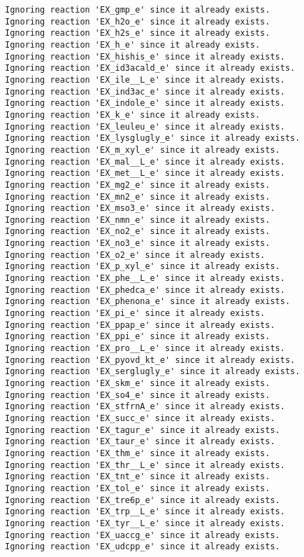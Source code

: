 \documentclass[
  letterpaper,
  DIV=11,
  numbers=noendperiod]{scrartcl}
\begin{document}
\begin{verbatim}
Ignoring reaction 'EX_gmp_e' since it already exists.
Ignoring reaction 'EX_h2o_e' since it already exists.
Ignoring reaction 'EX_h2s_e' since it already exists.
Ignoring reaction 'EX_h_e' since it already exists.
Ignoring reaction 'EX_hishis_e' since it already exists.
Ignoring reaction 'EX_id3acald_e' since it already exists.
Ignoring reaction 'EX_ile__L_e' since it already exists.
Ignoring reaction 'EX_ind3ac_e' since it already exists.
Ignoring reaction 'EX_indole_e' since it already exists.
Ignoring reaction 'EX_k_e' since it already exists.
Ignoring reaction 'EX_leuleu_e' since it already exists.
Ignoring reaction 'EX_lysglugly_e' since it already exists.
Ignoring reaction 'EX_m_xyl_e' since it already exists.
Ignoring reaction 'EX_mal__L_e' since it already exists.
Ignoring reaction 'EX_met__L_e' since it already exists.
Ignoring reaction 'EX_mg2_e' since it already exists.
Ignoring reaction 'EX_mn2_e' since it already exists.
Ignoring reaction 'EX_mso3_e' since it already exists.
Ignoring reaction 'EX_nmn_e' since it already exists.
Ignoring reaction 'EX_no2_e' since it already exists.
Ignoring reaction 'EX_no3_e' since it already exists.
Ignoring reaction 'EX_o2_e' since it already exists.
Ignoring reaction 'EX_p_xyl_e' since it already exists.
Ignoring reaction 'EX_phe__L_e' since it already exists.
Ignoring reaction 'EX_phedca_e' since it already exists.
Ignoring reaction 'EX_phenona_e' since it already exists.
Ignoring reaction 'EX_pi_e' since it already exists.
Ignoring reaction 'EX_ppap_e' since it already exists.
Ignoring reaction 'EX_ppi_e' since it already exists.
Ignoring reaction 'EX_pro__L_e' since it already exists.
Ignoring reaction 'EX_pyovd_kt_e' since it already exists.
Ignoring reaction 'EX_serglugly_e' since it already exists.
Ignoring reaction 'EX_skm_e' since it already exists.
Ignoring reaction 'EX_so4_e' since it already exists.
Ignoring reaction 'EX_stfrnA_e' since it already exists.
Ignoring reaction 'EX_succ_e' since it already exists.
Ignoring reaction 'EX_tagur_e' since it already exists.
Ignoring reaction 'EX_taur_e' since it already exists.
Ignoring reaction 'EX_thm_e' since it already exists.
Ignoring reaction 'EX_thr__L_e' since it already exists.
Ignoring reaction 'EX_tnt_e' since it already exists.
Ignoring reaction 'EX_tol_e' since it already exists.
Ignoring reaction 'EX_tre6p_e' since it already exists.
Ignoring reaction 'EX_trp__L_e' since it already exists.
Ignoring reaction 'EX_tyr__L_e' since it already exists.
Ignoring reaction 'EX_uaccg_e' since it already exists.
Ignoring reaction 'EX_udcpp_e' since it already exists.

\end{verbatim}
\end{document}

